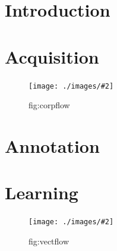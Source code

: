 \documentclass[12pt,a4paper,pdftex,twoside,liststotoc,listsleft]{scrartcl}
\title{\mytitle}
\date{\today}
\author{\myauthor}
\newcommand{\fig}[4]
{
 \begin{figure}[h]
  \centering
  \texttt{[image: ./images/\#2]}
  \caption{#3}
  \label{#4}
 \end{figure}
}
\begin{document}
\maketitle

\begin{abstract}
The Abstract.
\end{abstract}

\newpage
\tableofcontents

\section{Introduction}
\section{Acquisition}
\fig{1.0}{corpflow.pdf}{fig:corpflow}{Details}
\section{Annotation}
\section{Learning}
\fig{1.0}{vectflow.pdf}{fig:vectflow}{Details}

\appendix
\clearpage


\end{document}

